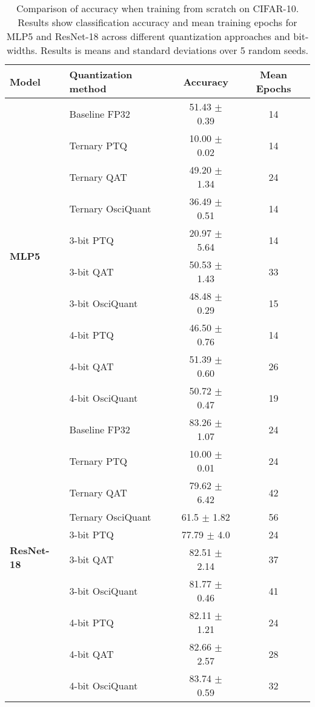 \begin{table}[t]
\centering
\scriptsize
\begin{tabular}{llcc}
\toprule
{\bf Model} & {\bf Quantization method} & {\bf Accuracy} & {\bf Mean Epochs} \\
\midrule
\multirow{10}{*}{\bf MLP5} 
 & Baseline FP32 & 51.43 $\pm$ 0.39 & 14 \\
 \cmidrule(lr){2-4}
 & Ternary PTQ & 10.00 $\pm$ 0.02 & 14 \\
 & Ternary QAT & { 49.20 $\pm$ 1.34} & 24\\
 & Ternary OsciQuant & 36.49 $\pm$ 0.51 & 14\\
 \cmidrule(lr){2-4}
 & 3-bit PTQ & 20.97 $\pm$ 5.64 & 14 \\
 & 3-bit QAT & 50.53 $\pm$ 1.43 & 33\\
 & 3-bit OsciQuant & 48.48 $\pm$ 0.29 & 15\\
 \cmidrule(lr){2-4}
 & 4-bit PTQ & 46.50 $\pm$ 0.76 & 14 \\
 & 4-bit QAT & 51.39 $\pm$ 0.60 & 26\\
 & 4-bit OsciQuant & 50.72 $\pm$ 0.47 & 19\\
\midrule
\multirow{10}{*}{\bf ResNet-18} 
& Baseline FP32 & 83.26 $\pm$ 1.07 & 24 \\ 
\cmidrule(lr){2-4}
& Ternary PTQ & 10.00 $\pm$ 0.01 & 24 \\ 
& Ternary QAT & 79.62 $\pm$ 6.42 & 42 \\
& Ternary OsciQuant & 61.5 $\pm$ 1.82 & 56 \\
\cmidrule(lr){2-4}
& 3-bit PTQ & 77.79 $\pm$ 4.0 & 24 \\
& 3-bit QAT & 82.51 $\pm$ 2.14 & 37 \\
& 3-bit OsciQuant & 81.77 $\pm$ 0.46 & 41 \\
\cmidrule(lr){2-4}
& 4-bit PTQ & 82.11 $\pm$ 1.21 & 24 \\ 
& 4-bit QAT & 82.66 $\pm$ 2.57 & 28 \\
& 4-bit OsciQuant & 83.74 $\pm$ 0.59 & 32 \\
\bottomrule
\end{tabular}
\caption{Comparison of accuracy when training from scratch on CIFAR-10. Results show classification accuracy and mean training epochs for MLP5 and ResNet-18 across different quantization approaches and bit-widths. Results is means and standard deviations over 5 random seeds.}
\label{tab:training_scratch}
\end{table}

